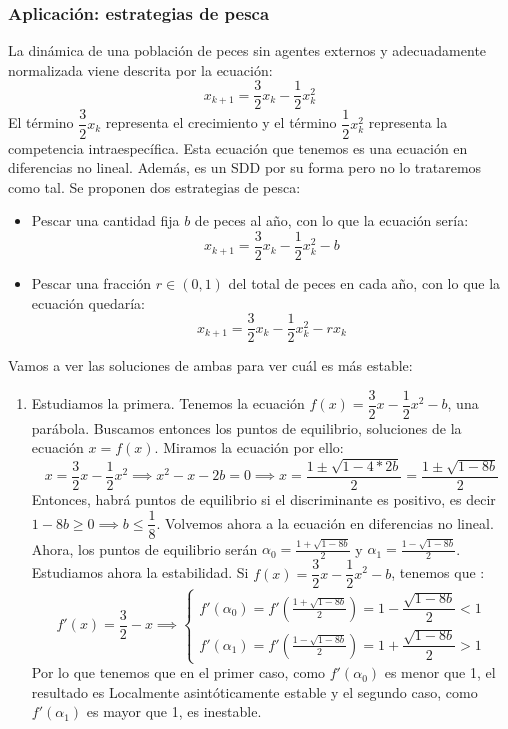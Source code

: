 \subsubsection{Aplicación: estrategias de pesca}
\begin{ejemplo}
	La dinámica de una población de peces sin agentes externos y adecuadamente normalizada viene descrita por la ecuación:
	\[
	x_{k+1}= \dfrac{3}{2}x_k -\dfrac{1}{2} x_k^2
	\]
	El término $\dfrac{3}{2}x_k$ representa el crecimiento y el término $\dfrac{1}{2} x_k^2$ representa la competencia intraespecífica.
	Esta ecuación que tenemos es una ecuación en diferencias no lineal. Además, es un SDD por su forma pero no lo trataremos como tal.
	Se proponen dos estrategias de pesca:
	\begin{itemize}
	\item Pescar una cantidad fija $b$ de peces al año, con lo que la ecuación sería:
	\[
	x_{k+1}= \dfrac{3}{2}x_k -\dfrac{1}{2} x_k^2 -b
	\]
	\item Pescar una fracción $r\in(0,1)$ del total de peces en cada año, con lo que la ecuación quedaría:
	\[
	x_{k+1}= \dfrac{3}{2}x_k -\dfrac{1}{2} x_k^2 -rx_k
	\]

\end{itemize}
Vamos a ver las soluciones de ambas para ver cuál es más estable:
\begin{enumerate}
	\item Estudiamos la primera. Tenemos la ecuación $f(x) = \dfrac{3}{2}x -\dfrac{1}{2} x^2 -b $, una parábola.
	Buscamos entonces los puntos de equilibrio, soluciones de la ecuación $x=f(x)$. Miramos la ecuación por ello:
	\[
	x= \dfrac{3}{2}x -\dfrac{1}{2} x^2 \implies x^2 -x - 2b = 0\implies x= \frac{1\pm \sqrt{1-4*2b}}{2}= \frac{1\pm \sqrt{1-8b}}{2}
	\]
	Entonces, habrá puntos de equilibrio si el discriminante es positivo, es decir $1-8b \geq 0 \implies b \leq \dfrac{1}{8}$. Volvemos ahora a la ecuación en diferencias no lineal.
	Ahora, los puntos de equilibrio serán $\alpha_0 = \frac{1 + \sqrt{1-8b}}{2}$ y $\alpha_1 = \frac{1- \sqrt{1-8b}}{2}$. Estudiamos ahora la estabilidad. Si $f(x) = \dfrac{3}{2}x-\dfrac{1}{2}x^2 -b$, tenemos que :
	\[
	f'(x)= \dfrac{3}{2}-x \implies \begin{cases}
	f'(\alpha_0) = f'(\frac{1 + \sqrt{1-8b}}{2}) = 1- \dfrac{\sqrt{1-8b}}{2} <1\\
	f'(\alpha_1) = f'(\frac{1 - \sqrt{1-8b}}{2})=1+ \dfrac{\sqrt{1-8b}}{2} > 1
\end{cases}
	\]
	Por lo que tenemos que en el primer caso, como $f'(\alpha_0)$ es menor que 1, el resultado es Localmente asintóticamente estable y el segundo caso, como $f'(\alpha_1)$ es mayor que 1, es inestable.


\end{enumerate}
\end{ejemplo}
